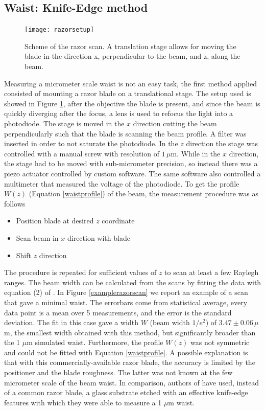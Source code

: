 \subsection{Waist: Knife-Edge method}
\label{sec:knifeedge}
\begin{figure}[H]
\centering
\texttt{[image: razorsetup]}
\caption{Scheme of the razor scan. A translation stage allows for moving the blade in the direction x, perpendicular to the beam, and z, along the beam.}
\label{razorscan}
\end{figure}
Measuring a micrometer scale waist is not an easy task, the first method applied consisted of mounting a razor blade on a translational stage. The setup used is showed in Figure \ref{razorscan}, after the objective the blade is present, and since the beam is quickly diverging after the focus, a lens is used to refocus the light into a photodiode. The stage is moved in the $x$ direction cutting the beam perpendicularly such that the blade is scanning the beam profile. A filter was inserted in order to not saturate the photodiode.
In the $z$ direction the stage was controlled with a manual screw with resolution of $1\,\mu$m. While in the $x$ direction, the stage had to be moved with sub-micrometer precision, so instead there was a piezo actuator controlled by custom software. The same software also controlled a multimeter that measured the voltage of the photodiode. To get the profile $W(z)$ (Equation \eqref{waistprofile}) of the beam, the measurement procedure was as follows
\begin{itemize}
\item Position blade at desired $z$ coordinate
\item Scan beam in $x$ direction with blade
\item Shift $z$ direction
\end{itemize}
The procedure is repeated for sufficient values of $z$ to scan at least a few Raylegh ranges. The beam width can be calculated from the scans by fitting the data with equation (2) of \cite{knifeedge}. In Figure \ref{examplerazorscan} we report an example of a scan that gave a minimal waist. The errorbars come from statistical average, every data point is a mean over 5 measurements, and the error is the standard deviation. The fit in this case gave a width $W$ (beam width $1/e^2$) of $3.47\pm 0.06\,\mu$m, the smallest width obtained with this method, but significantly broader than the 1 $\mu$m simulated waist. Furthermore, the profile $W(z)$ was not symmetric and could not be fitted with Equation \eqref{waistprofile}. A possible explanation is that with this commercially-available razor blade, the accuracy is limited by the positioner and the blade roughness. The latter was not known at the few micrometer scale of the beam waist. In comparison, authors of \cite{Cannon:86} have used, instead of a common razor blade, a glass substrate etched with an effective knife-edge features with which they were able to measure a 1 $\mu$m waist.
